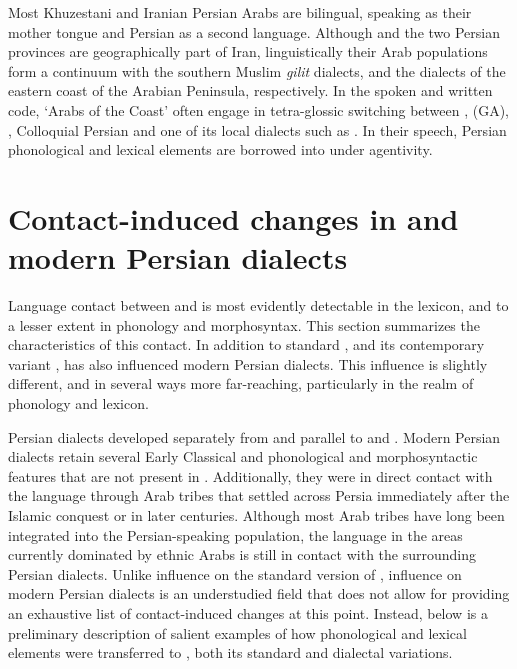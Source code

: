 \documentclass[output=paper]{langsci/langscibook}
\begin{document}
Most Khuzestani and Iranian Persian  Arabs are bilingual, speaking  as their mother tongue and Persian as a second language. Although  and the two Persian  provinces are geographically part of Iran, linguistically their Arab populations form a continuum with the southern  Muslim \textit{gilit}{} dialects, and the dialects of the eastern coast of the Arabian Peninsula, respectively. In the spoken and written code, ‘Arabs of the Coast’ often engage in tetra-glossic switching between ,   (GA), , Colloquial Persian and one of its local dialects such as . In their speech, Persian phonological and lexical elements are borrowed into  under  agentivity.

\section{Contact-induced changes in  and modern Persian dialects} \label{dial}
Language contact between  and  is most evidently detectable in the  lexicon, and to a lesser extent in phonology and morphosyntax. This section summarizes the characteristics of this contact. In addition to standard , and its contemporary variant ,  has also influenced modern Persian dialects. This influence is slightly different, and in several ways more far-reaching, particularly in the realm of phonology and lexicon.

Persian dialects developed separately from and parallel to  and . Modern Persian dialects retain several Early {Classical} and  phonological and morphosyntactic features that are not present in . Additionally, they were in direct contact with the  language through Arab tribes that settled across Persia immediately after the Islamic conquest or in later centuries. Although most Arab tribes have long been integrated into the Persian-speaking population, the  language in the areas currently dominated by ethnic Arabs is still in contact with the surrounding Persian dialects. Unlike  influence on the standard version of ,  influence on modern Persian dialects is an understudied field that does not allow for providing an exhaustive list of contact-induced changes at this point. Instead, below is a preliminary description of salient examples of how  phonological and lexical elements were transferred to , both its standard and dialectal variations.
\end{document}
